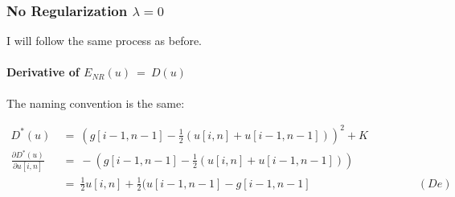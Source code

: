 \documentclass{report}
\begin{document}
			\subsubsection{No Regularization $\lambda = 0$}
			\startsubsection
				I will follow the same process as before.
				\vspace{-0.4cm} \paragraph{Derivative of  $E_{NR}(u) \ = \ D(u)$}
				\startsubsection
					The naming convention is the same:
				\closesection
				\begin{adjustwidth}{-6em}{}
					\vspace{-0.6cm}
					\begin{align*}
						D^*(u) \ & = \ (g[i-1,n-1] - \frac{1}{2} (u[i,n] + u[i-1,n-1]))^2 + K \\
						\frac{\partial D^*(u)}{\partial u[i,n]} \ & = \ - (g[i-1,n-1] - \frac{1}{2} (u[i,n] + u[i-1,n-1])) \\
						& = \ \frac{1}{2} u[i,n]  + \frac{1}{2} (u[i-1,n-1] - g[i-1,n-1] \hspace{4cm} (De)
					\end{align*}
				\end{adjustwidth}
			\closesection
\end{document}
